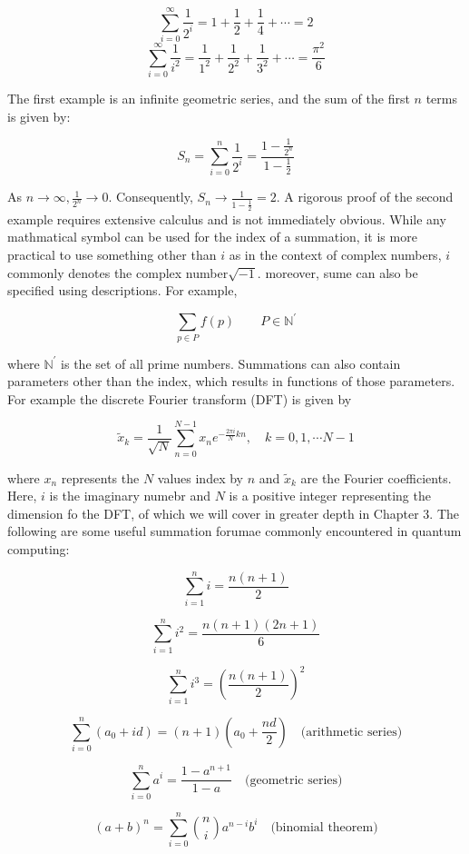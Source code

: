 \documentclass[12pt]{article}
\theoremstyle{definition}
\begin{document}
$$\sum_{i=0}^{\infty} \frac{1}{2^i} = 1 + \frac{1}{2} + \frac{1}{4} + \cdots = 2$$
$$\sum_{i=0}^{\infty}  \frac{1}{i^2} = \frac{1}{1^2} + \frac{1}{2^2} + \frac{1}{3^2} + \cdots = \frac{\pi^2}{6}$$

The first example is an infinite geometric series, and the sum of the first $n$ terms is given by:

$$S_n = \sum_{i=0}^{n} \frac{1}{2^i} = \frac{1 - \frac{1}{2^n}}{1 - \frac{1}{2}}$$

As $n \rightarrow \infty, \frac{1}{2^n} \rightarrow 0$. Consequently, $S_n \rightarrow \frac{1}{1 - \frac{1}{2}} = 2$. A rigorous proof of the second example requires extensive calculus and is not immediately obvious. While any mathmatical symbol can be used for the index of a summation, it is more practical to use something other than $i$ as in the context of complex numbers, $i$ commonly denotes the complex number$\sqrt{-1}$. moreover, sume can also be specified using descriptions. For example, 

$$\sum_{p \in P} f(p) \qquad P \in \mathbb{N^\prime}$$

where $\mathbb{N^\prime}$ is the set of all prime numbers. Summations can also contain parameters other than the index, which results in functions of those parameters. For example the discrete Fourier transform (DFT) is given by

$$\tilde{x}_k = \frac{1}{\sqrt{N}} \sum_{n=0}^{N - 1} x_n e^{- \frac{2 \pi i}{N} kn}, \quad k = 0, 1, \cdots N-1$$

where $x_n$ represents the $N$ values index by $n$ and $\tilde{x}_k$ are the Fourier coefficients. Here, $i$ is the imaginary numebr and $N$ is a positive integer representing the dimension fo the DFT, of which we will cover in greater depth in Chapter 3. The following are some useful summation forumae commonly encountered in quantum computing:

\[
\sum_{i=1}^{n} i = \frac{n(n+1)}{2}
\]

\[
\sum_{i=1}^{n} i^2 = \frac{n(n+1)(2n+1)}{6}
\]

\[
\sum_{i=1}^{n} i^3 = \left(\frac{n(n+1)}{2}\right)^2
\]

\[
\sum_{i=0}^{n} \left(a_0 + id\right) = (n+1)\left(a_0 + \frac{nd}{2}\right) \quad \text{(arithmetic series)}
\]

\[
\sum_{i=0}^{n} a^i = \frac{1 - a^{n+1}}{1 - a} \quad \text{(geometric series)}
\]

\[
(a + b)^n = \sum_{i=0}^{n} \binom{n}{i} a^{n-i} b^i \quad \text{(binomial theorem)}
\]
\end{document}
